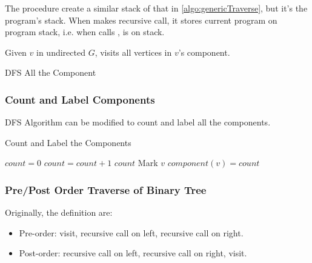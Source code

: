 \observation The procedure create a similar stack of that
in \cref{algo:genericTraverse}, but it's the program's stack.
When  makes recursive call, it stores
current program on program stack, i.e. when 
calls ,  is on stack.


Given $v$ in undirected $G$,  visits
all vertices in $v$'s component.

\begin{algorithm}[H]
    \caption{DFS All the Component}\label{algo:dfsall}
    \begin{algorithmic}[1]
                    \State{}
                \EndIf
            \EndFor
        \EndProcedure
    \end{algorithmic}
\end{algorithm}

\subsubsection{Count and Label Components}
DFS Algorithm can be modified to count and label all the components.
\begin{algorithm}[H]
\caption{Count and Label the Components}\label{algo:countlabel}
    \begin{algorithmic}[1]
            \State $count = 0$
                    \State $count = count + 1$
                    \State{}
                \EndIf
            \EndFor
            \Return $count$
        \EndProcedure
            \State Mark $v$
            \State $component(v) = count$
                    \State{}
                \EndIf
            \EndFor
        \EndProcedure
    \end{algorithmic}
\end{algorithm}

\subsubsection{Pre/Post Order Traverse of Binary Tree}

Originally, the definition are:
\begin{itemize}
    \item Pre-order: visit, recursive call on left, recursive call on right.
    \item Post-order: recursive call on left, recursive call on right, visit.
\end{itemize}

